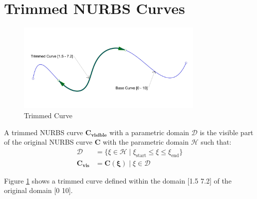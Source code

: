 \documentclass[12pt, a4paper]{report}
\begin{document}
\section{Trimmed NURBS Curves}
\begin{figure}[H]
\centering
\includegraphics[width=0.8\textwidth]{Images/trimCurveDemo.png}
\caption{Trimmed Curve}
\label{fig:trCurv}
\end{figure}
A trimmed NURBS curve $\mathbf{C_{visible}}$ with a parametric domain $\mathcal{D}$ is the visible part of the original NURBS curve $\mathbf{C}$ with the parametric domain $\mathcal{H}$ such that:
\begin{align}
\mathcal{D} &= \{\xi \in \mathcal{H} \mid \xi_{\text{start}} \leq \xi \leq \xi_{\text{end}}\} \\
\mathbf{C_{vis}} &= \mathbf{C(\xi)} \mid \xi \in \mathcal{D}
\end{align}

Figure \ref{fig:trCurv} shows a trimmed curve defined within the domain [1.5 7.2] of the original domain [0 10].
\end{document}
